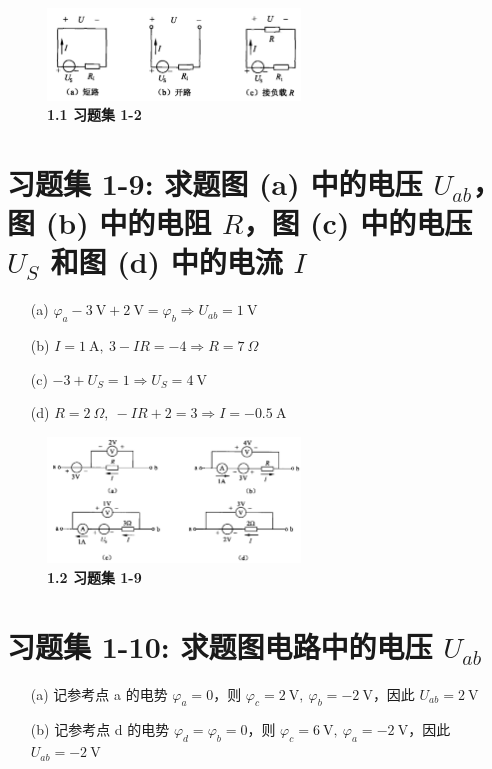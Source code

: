 \documentclass[UTF8]{report}
\theoremstyle{MyLineTheoremStyle} %
\theoremstyle{MyBlockTheoremStyle} %
\theoremstyle{MySubsubsectionStyle} %
\begin{document}
\begin{figure}[H]\centering
\includegraphics[width=0.6\textwidth]{assets/1/ae1cfc03fad5c98bfff08a663714a004.png}
\caption{\bfseries 1.1 习题集 1-2}
\end{figure}

\section{习题集 1-9: 求题图 (a) 中的电压 $U_{ab}$，图 (b) 中的电阻 $R$，图 (c) 中的电压 $U_S$ 和图 (d) 中的电流 $I$}

\begin{enumerate}
    \item[(a)]  $ \varphi_a - 3\ \mathrm{V} + 2\ \mathrm{V} = \varphi_b \Longrightarrow U_{ab} = 1\ \mathrm{V} $ 
    \item[(b)] $I = 1\ \mathrm{A},\  3 -IR= -4 \Longrightarrow R = 7\ \Omega$ 
    \item[(c)] $-3 + U_S = 1 \Longrightarrow U_S = 4 \ \mathrm{V}$ 
    \item[(d)] $R=2\ \Omega,\ -IR + 2 = 3 \Longrightarrow I = -0.5\ \mathrm{A}$ 
\end{enumerate}

\begin{figure}[H]\centering
    \includegraphics[width=0.6\textwidth]{assets/1/d3d69ecd6b1c1bc476fd4a4957fb9e56.png}
\caption{\bfseries 1.2 习题集 1-9}
\end{figure}

\section{习题集 1-10: 求题图电路中的电压 $U_{ab}$}



\begin{enumerate}
\item[(a)] 
记参考点 a 的电势 $\varphi_a=0$，则 $\varphi_c = 2\ \mathrm{V} ,\ \varphi_b = -2\ \mathrm{V}$，因此 $U_{ab} = 2\ \mathrm{V}$

\item[(b)] 
记参考点 d 的电势 $\varphi_d = \varphi_b =0$，则 $\varphi_c = 6\ \mathrm{V},\ \varphi_a = -2\ \mathrm{V}$，因此 $U_{ab} = -2\ \mathrm{V}$

\end{enumerate}
\end{document}
